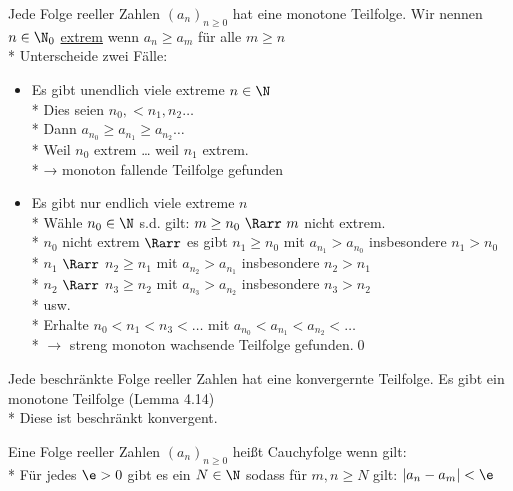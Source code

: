 Jede Folge reeller Zahlen $(a_n)_{n\geq 0}$ hat eine monotone Teilfolge.
\bew
Wir nennen $n\in \N_0$ \ul{extrem} wenn $a_n \geq a_m$ für alle $m \geq n$\\*
Unterscheide zwei Fälle:
\begin{itemize}
    \item{Es gibt unendlich viele extreme $n \in \N$\\*
Dies seien $n_0, < n_1, n_2…$\\*
Dann $a_{n_0} \geq a_{n_1} \geq a_{n_2} …$\\*
Weil $n_0$ extrem … weil $n_1$ extrem.\\*
→ monoton fallende Teilfolge gefunden}
    \item{Es gibt nur endlich viele extreme $n$\\*
Wähle $n_0 \in \N$ s.d. gilt: $m \geq n_0\ \Rarr\ m$ nicht extrem.\\*
$n_0$ nicht extrem $\Rarr$ es gibt $n_1 \geq n_0$ mit $a_{n_1} > a_{n_0}$ insbesondere $n_1 > n_0$\\*
$n_1$ \phantom{nicht extrem }$\Rarr$ \phantom{es gibt }$n_2 \geq n_1$ mit $a_{n_2} > a_{n_1}$ insbesondere $n_2 > n_1$\\*
$n_2$ \phantom{nicht extrem }$\Rarr$ \phantom{es gibt }$n_3 \geq n_2$ mit $a_{n_3} > a_{n_2}$ insbesondere $n_3 > n_2$\\*
usw.\\*
Erhalte $n_0 < n_1 < n_3 < …$ mit $a_{n_0} < a_{n_1} < a_{n_2} < …$ \\*
$\to $ streng monoton wachsende Teilfolge gefunden.\qed
}
\end{itemize}

Jede beschränkte Folge reeller Zahlen hat eine konvergernte Teilfolge.
\bew
Es gibt ein monotone Teilfolge (Lemma 4.14)\\*
Diese ist beschränkt \Rarr konvergent.

Eine Folge reeller Zahlen $(a_n)_{n \geq 0}$ heißt Cauchyfolge wenn gilt:\\*
Für jedes $\e > 0$ gibt es ein $N \in \N$ sodass für $m, n \geq N$ gilt: $|a_n - a_m| < \e$


